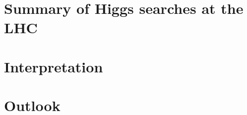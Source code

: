 \documentclass[hyper,linkcolor=blue]{mythesis}
\begin{document}
\begin{mainmatter}
    \section{Summary of Higgs searches at the LHC}
      \label{sec:searches}
      
    \section{Interpretation}
      \label{sec:interpretation}
      
    \section{Outlook}
      \label{sec:outlook}
      
\end{mainmatter}

\begin{appendices}

\end{appendices}

\begin{backmatter}
  
  
\end{backmatter}
\end{document}
